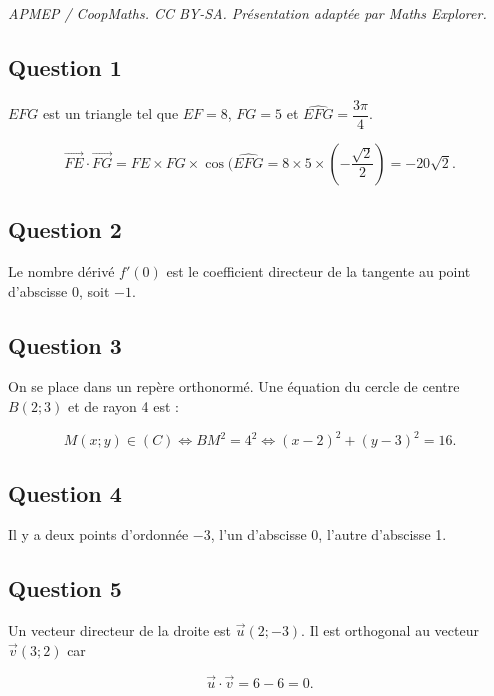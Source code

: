 \documentclass[10pt]{article}
\begin{document}
\noindent\textit{APMEP / CoopMaths. CC BY-SA. Présentation adaptée par Maths Explorer.}\par\medskip
\subsection*{Question 1}
	
	\(EFG\) est un triangle tel que \(EF = 8\), \(FG = 5\) et \(\widehat{EFG} = \dfrac{3\pi}{4}\).
	
	\[
	\overrightarrow{FE} \cdot \overrightarrow{FG} = FE \times FG \times \cos(\widehat{EFG} = 8 \times 5 \times \left( -\dfrac{\sqrt{2}}{2} \right) = -20 \sqrt{2}.
	\]
	
	\subsection*{Question 2}
	
	Le nombre dérivé \(f'(0)\) est le coefficient directeur de la tangente au point d’abscisse 0, soit \(-1\).
	
	\subsection*{Question 3}
	
	On se place dans un repère orthonormé. Une équation du cercle de centre \(B(2 ; 3)\) et de rayon 4 est :
	
	\[
	M(x ; y) \in (C) \iff BM^2 = 4^2 \iff (x - 2)^2 + (y - 3)^2 = 16.
	\]
	
	\subsection*{Question 4}
	
	Il y a deux points d’ordonnée \(-3\), l’un d’abscisse 0, l’autre d’abscisse 1.
	
	\subsection*{Question 5}
	
	Un vecteur directeur de la droite est \(\overrightarrow{u}(2 ; -3)\). Il est orthogonal au vecteur \(\overrightarrow{v}(3 ; 2)\) car
	
	\[
	\overrightarrow{u} \cdot \overrightarrow{v} = 6 - 6 = 0.
	\]
\end{document}
